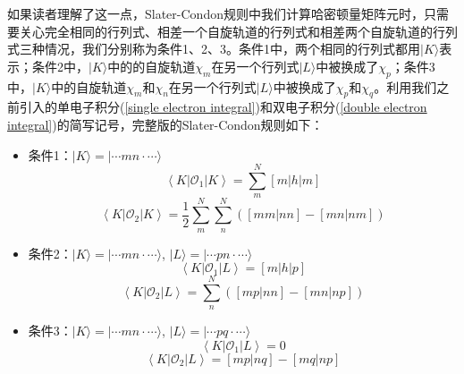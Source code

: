 \documentclass[12pt,a4paper,openany,twoside]{book}
\numberwithin{equation}{section}
\begin{document}
          如果读者理解了这一点，Slater-Condon规则中我们计算哈密顿量矩阵元时，只需要关心完全相同的行列式、相差一个自旋轨道的行列式和相差两个自旋轨道的行列式三种情况，我们分别称为条件1、2、3。条件1中，两个相同的行列式都用$|K\rangle$表示；条件2中，$|K\rangle$中的的自旋轨道$\chi_m$在另一个行列式$|L\rangle$中被换成了$\chi_p$；条件3中，$|K\rangle$中的自旋轨道$\chi_m$和$\chi_n$在另一个行列式$|L\rangle$中被换成了$\chi_p$和$\chi_q$。利用我们之前引入的单电子积分(\ref{single electron integral})和双电子积分(\ref{double electron integral})的简写记号，完整版的Slater-Condon规则如下：
          \begin{itemize}
            \item 条件1：$|K\rangle=|\cdots m n \cdot \cdots\rangle$
            \begin{equation}
              \left\langle K\left|\mathcal{O}_{1}\right| K\right\rangle=\sum_{m}^{N}[m|h| m]
              \label{case1 1e}
            \end{equation}
            \begin{equation}
              \left\langle K\left|\mathcal{O}_{2}\right| K\right\rangle=\frac{1}{2} \sum_{m}^{N} \sum_{n}^{N}\left([m m | n n]-[m n | n m]\right)
              \label{case1 2e}
            \end{equation}
            \item 条件2：$|K\rangle=|\cdots m n \cdot \cdots\rangle$, $|L\rangle=|\cdots p n \cdot \cdots\rangle$
            \begin{equation}
              \left\langle K\left|\mathcal{O}_{1}\right| L\right\rangle=[m|h| p]
              \label{case2 1e}
            \end{equation}
            \begin{equation}
              \left\langle K\left|\mathcal{O}_{2}\right| L\right\rangle=\sum_{n}^{N}\left([m p | n n]-[m n | n p]\right)
              \label{case2 2e}
            \end{equation}
            \item 条件3：$|K\rangle=|\cdots m n \cdot \cdots\rangle$, $|L\rangle=|\cdots pq \cdot \cdots\rangle$
            \begin{equation}
              \left\langle K\left|\mathcal{O}_{1}\right| L\right\rangle= 0
              \label{case3 1e}
            \end{equation}
            \begin{equation}
              \left\langle K\left|\mathcal{O}_{2}\right| L\right\rangle=[m p | n q]-[m q | n p]
              \label{case3 2e}
            \end{equation}
          \end{itemize}
\end{document}
